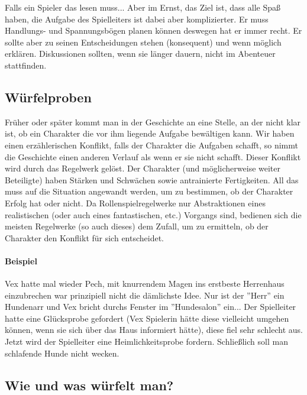 \documentclass{article}
\begin{document}
Falls ein Spieler das lesen muss... Aber im Ernst, das Ziel ist, dass alle Spaß haben, die Aufgabe des Spielleiters ist
dabei aber komplizierter. Er muss Handlungs- und Spannungsbögen planen können deswegen hat er immer recht. Er sollte
aber zu seinen Entscheidungen stehen (konsequent) und wenn möglich erklären. Diskussionen sollten, wenn sie länger
dauern, nicht im Abenteuer stattfinden.

\begin{center}
\section{Würfelproben}
\end{center}

Früher oder später kommt man in der Geschichte an eine Stelle, an der nicht klar ist, ob ein Charakter die vor ihm
liegende Aufgabe bewältigen kann. Wir haben einen erzählerischen Konflikt, falls der Charakter die Aufgaben schafft,
so nimmt die Geschichte einen anderen Verlauf als wenn er sie nicht schafft. Dieser Konflikt wird durch das Regelwerk
gelöst. Der Charakter (und möglicherweise weiter Beteiligte) haben Stärken und Schwächen sowie antrainierte
Fertigkeiten. All das muss auf die Situation angewandt werden, um zu bestimmen, ob der Charakter Erfolg hat oder nicht.
Da Rollenspielregelwerke nur Abstraktionen eines realistischen (oder auch eines fantastischen, etc.) Vorgangs sind,
bedienen sich die meisten Regelwerke (so auch dieses) dem Zufall, um zu ermitteln, ob der Charakter den Konflikt für
sich entscheidet.

\paragraph{Beispiel}

Vex hatte mal wieder Pech, mit knurrendem Magen ins erstbeste Herrenhaus einzubrechen war prinzipiell nicht die
dämlichste Idee. Nur ist der ''Herr'' ein Hundenarr und Vex bricht durchs Fenster im ''Hundesalon'' ein...
Der Spielleiter hatte eine Glücksprobe gefordert (Vex Spielerin hätte diese vielleicht umgehen können, wenn sie sich
über das Haus informiert hätte), diese fiel sehr schlecht aus. Jetzt wird der Spielleiter eine Heimlichkeitsprobe
fordern. Schließlich soll man schlafende Hunde nicht wecken.

\begin{center}
\subsection{Wie und was würfelt man?}
\end{center}
\end{document}
